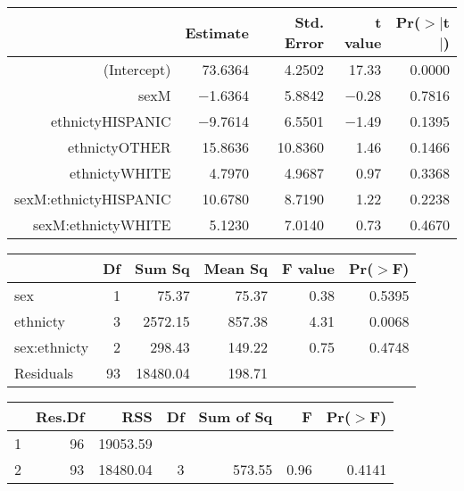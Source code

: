 \documentclass{article}
\begin{document}
\begin{table}[ht]
\begin{center}
\begin{tabular}{rrrrr}
\hline
 & Estimate & Std. Error & t value & Pr($>$$|$t$|$) \\
\hline
(Intercept) & 73.6364 & 4.2502 & 17.33 & 0.0000 \\
sexM & $-$1.6364 & 5.8842 & $-$0.28 & 0.7816 \\
ethnictyHISPANIC & $-$9.7614 & 6.5501 & $-$1.49 & 0.1395 \\
ethnictyOTHER & 15.8636 & 10.8360 & 1.46 & 0.1466 \\
ethnictyWHITE & 4.7970 & 4.9687 & 0.97 & 0.3368 \\
sexM:ethnictyHISPANIC & 10.6780 & 8.7190 & 1.22 & 0.2238 \\
sexM:ethnictyWHITE & 5.1230 & 7.0140 & 0.73 & 0.4670 \\
\hline
\end{tabular}
\end{center}
\end{table}
\begin{table}[ht]
\begin{center}
\begin{tabular}{lrrrrr}
\hline
 & Df & Sum Sq & Mean Sq & F value & Pr($>$F) \\
\hline
sex & 1 & 75.37 & 75.37 & 0.38 & 0.5395 \\
ethnicty & 3 & 2572.15 & 857.38 & 4.31 & 0.0068 \\
sex:ethnicty & 2 & 298.43 & 149.22 & 0.75 & 0.4748 \\
Residuals & 93 & 18480.04 & 198.71 &  &  \\
\hline
\end{tabular}
\end{center}
\end{table}
\begin{table}[ht]
\begin{center}
\begin{tabular}{lrrrrrr}
\hline
 & Res.Df & RSS & Df & Sum of Sq & F & Pr($>$F) \\
\hline
1 & 96 & 19053.59 &  &  &  &  \\
2 & 93 & 18480.04 & 3 & 573.55 & 0.96 & 0.4141 \\
\hline
\end{tabular}
\end{center}
\end{table}
\end{document}
